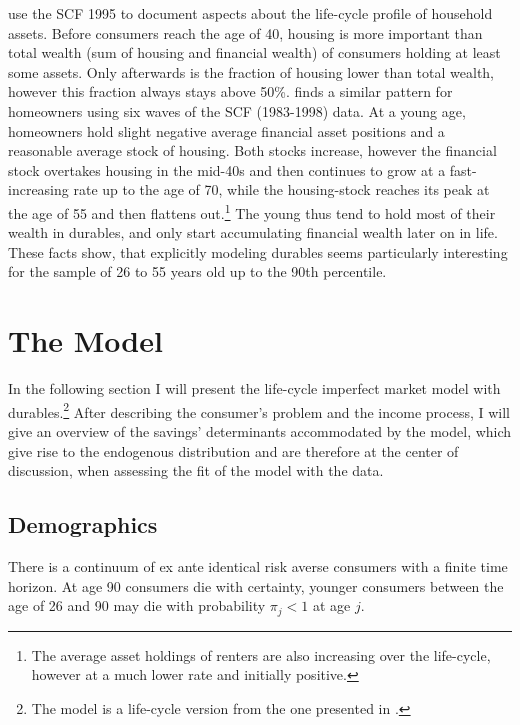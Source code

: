 \documentclass[a4paper,12pt,legno]{article}
\begin{document}
\cite{FV&K2011} use the SCF 1995 to document aspects about the life-cycle profile of household assets. Before consumers reach the age of 40, housing is more important than total wealth (sum of housing and financial wealth) of consumers holding at least some assets. Only afterwards is the fraction of housing lower than total wealth, however this fraction always stays above 50\%. \cite{yang2009} finds a similar pattern for  homeowners using six waves of the SCF (1983-1998) data. At a young age,  homeowners hold slight negative average financial asset positions and a reasonable average stock of housing. Both stocks increase, however the financial stock overtakes housing in the mid-40s and then continues to grow at a fast-increasing rate up to the age of 70, while the housing-stock reaches its peak at the age of 55 and then flattens out.\footnote{The average asset holdings of renters are also increasing over the life-cycle, however at a much lower rate and initially positive.} The young thus tend to hold most of their wealth in durables, and only start accumulating financial wealth later on in life.
\\ These facts show, that explicitly modeling durables seems particularly interesting for the sample of 26 to 55 years old up to the 90th percentile.

\section{The Model}
\label{model}
In the following section I will present the life-cycle imperfect market model with durables.\footnote{The model is a life-cycle version from the one presented in \cite{hintermaier2010}.} After describing the consumer's problem and the income process, I will give an overview  of the savings' determinants accommodated by the model, which give rise to the endogenous distribution and are therefore at the center of discussion, when assessing the fit of the model with the data.

\subsection{Demographics}
There is a continuum of ex ante identical risk averse consumers with a finite time horizon. At age 90 consumers die with certainty, younger consumers between the age of 26 and 90 may die with probability $\pi_{j} < 1$ at age $j$.
\end{document}
